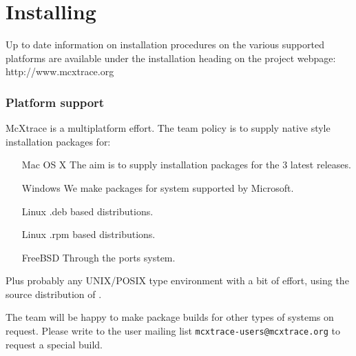 \chapter{Installing \MCX}
\label{c:install}
Up to date information on installation procedures on the various supported
platforms are available under the installation heading on the \MCX project
webpage: http://www.mcxtrace.org

\subsection{Platform support}
McXtrace is a multiplatform effort. The team policy is to supply native style installation packages
for:
\begin{itemize}
  \item[Mac OS X] The aim is to supply installation packages for the 3 latest releases.
  \item[Windows] We make packages for system supported by Microsoft.
  \item[Linux] .deb based distributions.
  \item[Linux] .rpm based distributions.
  \item[FreeBSD] Through the ports system.
\end{itemize}
Plus probably any UNIX/POSIX type environment with a bit of effort, using the source distribution of \MCX.

The team will be happy to make package builds for other types of systems on
request. Please write to the user mailing list
\texttt{mcxtrace-users@mcxtrace.org} to request a special build.

